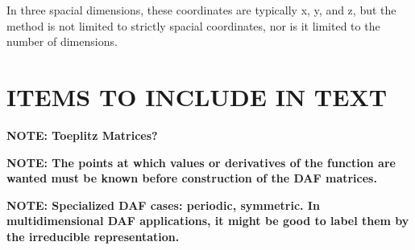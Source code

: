 \documentclass[preprint]{revtex4}
\begin{document}
In three spacial dimensions, these coordinates are typically x, y, and z, but the method is
not limited to strictly spacial coordinates, nor is it limited to the number of
dimensions. 


\section{ITEMS TO INCLUDE IN TEXT}
{\bf NOTE: Toeplitz Matrices?}

{\bf NOTE: The points at which values or derivatives of the function are wanted must be known
before construction of the DAF matrices. }

{\bf NOTE: Specialized DAF cases: periodic, symmetric. In multidimensional DAF applications, 
it might be good to label them by the irreducible representation.}

\appendix






\end{document}
